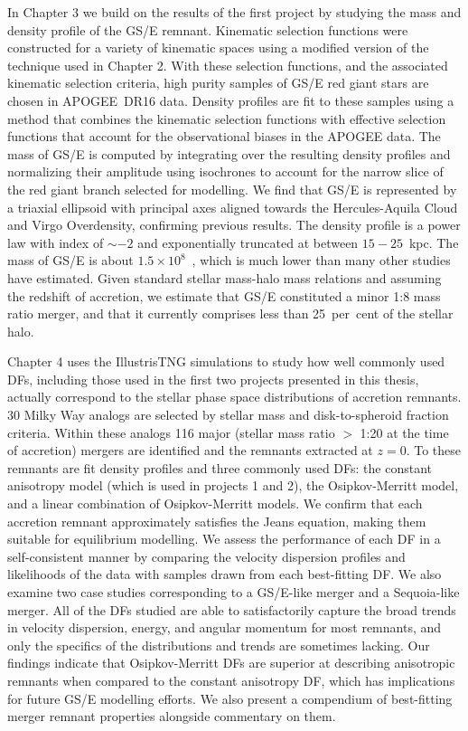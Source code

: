In Chapter 3 we build on the results of the first project by studying the mass and density profile of the GS/E remnant. Kinematic selection functions were constructed for a variety of kinematic spaces using a modified version of the technique used in Chapter 2. With these selection functions, and the associated kinematic selection criteria, high purity samples of GS/E red giant stars are chosen in APOGEE~DR16 data. Density profiles are fit to these samples using a method that combines the kinematic selection functions with effective selection functions that account for the observational biases in the APOGEE data. The mass of GS/E is computed by integrating over the resulting density profiles and normalizing their amplitude using isochrones to account for the narrow slice of the red giant branch selected for modelling. We find that GS/E is represented by a triaxial ellipsoid with principal axes aligned towards the Hercules-Aquila Cloud and Virgo Overdensity, confirming previous results. The density profile is a power law with index of $\sim -2$ and exponentially truncated at between $15-25$~kpc. The mass of GS/E is about $1.5\times10^{8}$~\Msun, which is much lower than many other studies have estimated. Given standard stellar mass-halo mass relations and assuming the redshift of accretion, we estimate that GS/E constituted a minor 1:8 mass ratio merger, and that it currently comprises less than 25~per~cent of the stellar halo.

Chapter 4 uses the IllustrisTNG simulations to study how well commonly used DFs, including those used in the first two projects presented in this thesis, actually correspond to the stellar phase space distributions of accretion remnants. 30 Milky Way analogs are selected by stellar mass and disk-to-spheroid fraction criteria. Within these analogs 116 major (stellar mass ratio $>$ 1:20 at the time of accretion) mergers are identified and the remnants extracted at $z=0$. To these remnants are fit density profiles and three commonly used DFs: the constant anisotropy model (which is used in projects 1 and 2), the Osipkov-Merritt model, and a linear combination of Osipkov-Merritt models. We confirm that each accretion remnant approximately satisfies the Jeans equation, making them suitable for equilibrium modelling. We assess the performance of each DF in a self-consistent manner by comparing the velocity dispersion profiles and likelihoods of the data with samples drawn from each best-fitting DF. We also examine two case studies corresponding to a GS/E-like merger and a Sequoia-like merger. All of the DFs studied are able to satisfactorily capture the broad trends in velocity dispersion, energy, and angular momentum for most remnants, and only the specifics of the distributions and trends are sometimes lacking. Our findings indicate that Osipkov-Merritt DFs are superior at describing anisotropic remnants when compared to the constant anisotropy DF, which has implications for future GS/E modelling efforts. We also present a compendium of best-fitting merger remnant properties alongside commentary on them.